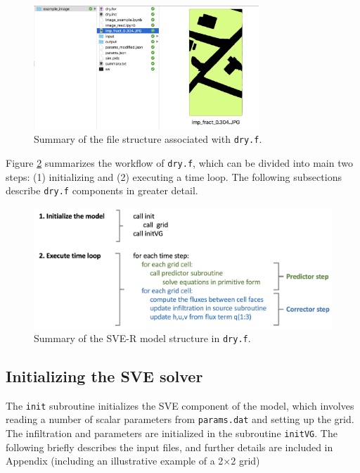 \documentclass{article}
\newcommand{\code}[1]{\texttt{#1}}
\begin{document}
 \begin{figure}[h]
 \centering
\includegraphics[width=20pc]{grid/files.png}
 \caption{Summary of the file structure associated with \code{dry.f}.}
 \label{files}
 \end{figure}


Figure \ref{summary} summarizes the workflow of \code{dry.f}, which can be divided into main two steps: (1) initializing and (2) executing a time loop.   The following subsections describe \code{dry.f} components in greater detail.


\begin{figure}[h]
 \centering
\includegraphics[width=30pc]{grid/summary.png}
 \caption{Summary of the SVE-R model structure in \code{dry.f}.}
 \label{summary}
 \end{figure}


\subsection{Initializing the SVE solver}
\label{SVEinit}
	
The \code{init} subroutine initializes the SVE component of the model,  which involves reading a number of scalar parameters from  \code{params.dat} and setting up the grid.
 The infiltration and parameters  are initialized in the subroutine \code{initVG}.  The following briefly describes the input files, and further details are included in Appendix (including an illustrative example of a  2$\times$2 grid)
  
\end{document}
